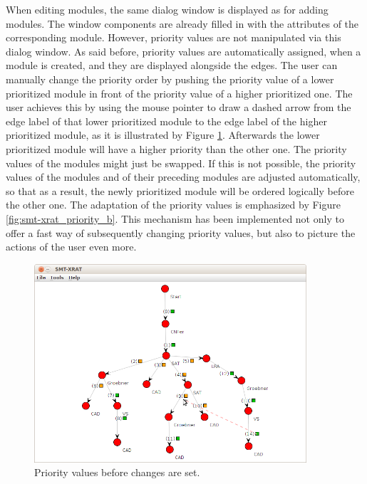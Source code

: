 When editing modules, the same dialog window is displayed as for adding modules. The window components are already filled in with the attributes of the corresponding module. However, priority values are not manipulated via this dialog window. As said before, priority values are automatically assigned, when a module is created, and they are displayed alongside the edges. The user can manually change the priority order by pushing the priority value of a lower prioritized module in front of the priority value of a higher prioritized one. The user achieves this by using the mouse pointer to draw a dashed arrow from the edge label of that lower prioritized module to the edge label of the higher prioritized module, as it is illustrated by Figure \ref{fig:smt-xrat_priority_a}. Afterwards the lower prioritized module will have a higher priority than the other one. The priority values of the modules might just be swapped. If this is not possible, the priority values of the modules and of their 
preceding modules are adjusted automatically, so that as a result, the newly prioritized module will be ordered logically before the other one. The adaptation of the priority values is emphasized by Figure \ref{fig:smt-xrat_priority_b}. This mechanism has been implemented not only to offer a fast way of subsequently changing priority values, but also to picture the actions of the user even more.
\begin{figure}
  \begin{center}
    \includegraphics[width=0.9\textwidth]{graphics/smt-xrat_priority_a.png}
  \end{center}
  \caption{Priority values before changes are set.}
  \label{fig:smt-xrat_priority_a}
\end{figure}


